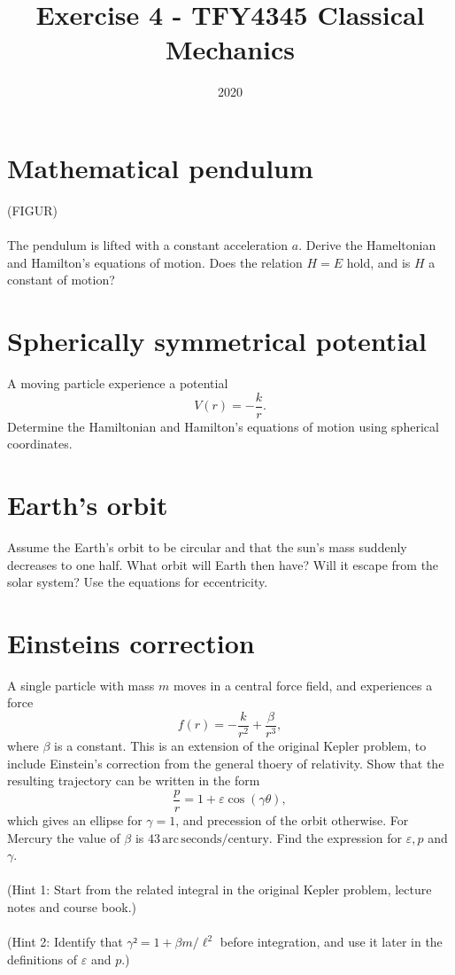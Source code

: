\documentclass{article}
\title{Exercise 4 - TFY4345 Classical Mechanics}
\date{2020}
\begin{document}
    \maketitle
    \section{Mathematical pendulum} 
        (FIGUR) \\ \\
        The pendulum is lifted with a constant acceleration $a$. Derive the Hameltonian and Hamilton's equations of motion. Does the relation $H = E$ hold, and is $H$ a constant of motion?

    \section{Spherically symmetrical potential}
        A moving particle experience a potential 
        \begin{equation*}
            V(r) = -\frac{k}{r}.
        \end{equation*}
        Determine the Hamiltonian and Hamilton's equations of motion using spherical coordinates.

    \section{Earth's orbit}
        Assume the Earth's orbit to be circular and that the sun's mass suddenly decreases to one half. What orbit will Earth then have? Will it escape from the solar system? Use the equations for eccentricity.

    \section{Einsteins correction}
        A single particle with mass $m$ moves in a central force field, and experiences a force 
        \begin{equation*}
            f(r) = -\frac{k}{r^2} + \frac{\beta}{r^3},
        \end{equation*}
        where $\beta$ is a constant. This is an extension of the original Kepler problem, to include Einstein's correction from the general thoery of relativity. Show that the resulting trajectory can be written in the form 
        \begin{equation*}
            \frac{p}{r} = 1 + \varepsilon \cos(\gamma \theta),
        \end{equation*}
        which gives an ellipse for $\gamma = 1$, and precession of the orbit otherwise. For Mercury the value of $\beta$ is $43 \, \mathrm{arc}\, \mathrm{seconds}/\mathrm{century}$. Find the expression for $\varepsilon, p$ and $\gamma$. \\ \\
        (Hint 1: Start from the related integral in the original Kepler problem, lecture notes and course book.) \\ \\
        (Hint 2: Identify that $\gamma² = 1 + \beta m / \ell^2$ before integration, and use it later in the definitions of $\varepsilon$ and $p$.)
\end{document}
